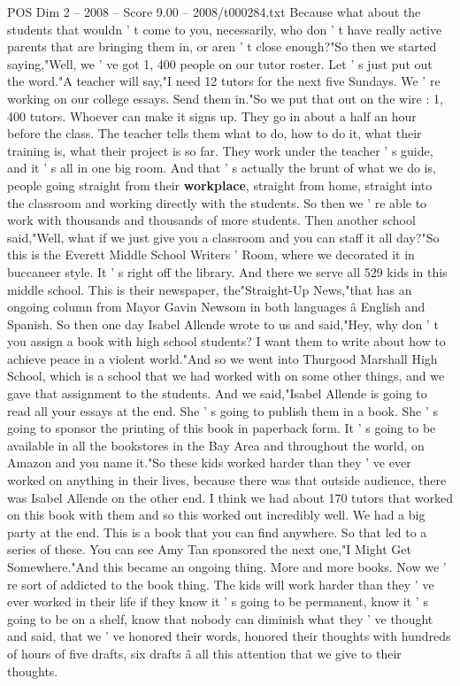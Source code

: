 \begin{textsample}{POS Dim 2 – 2008 – Score 9.00 – 2008/t000284.txt}
Because what about the students that wouldn ' t come to you, necessarily, who don ' t have really active parents that are bringing them in, or aren ' t close enough?"So then we started saying,"Well, we ' ve got 1, 400 people on our tutor roster.
Let ' s just put out the word."A teacher will say,"I need 12 tutors for the next five Sundays.
We ' re working on our college essays.
Send them in."So we put that out on the wire : 1, 400 tutors.
Whoever can make it signs up.
They go in about a half an hour before the class.
The teacher tells them what to do, how to do it, what their training is, what their project is so far.
They work under the teacher ' s guide, and it ' s all in one big room.
And that ' s actually the brunt of what we do is, people going straight from their \textbf{workplace}, straight from home, straight into the classroom and working directly with the students.
So then we ' re able to work with thousands and thousands of more students.
Then another school said,"Well, what if we just give you a classroom and you can staff it all day?"So this is the Everett Middle School Writers ' Room, where we decorated it in buccaneer style.
It ' s right off the library.
And there we serve all 529 kids in this middle school.
This is their newspaper, the"Straight-Up News,"that has an ongoing column from Mayor Gavin Newsom in both languages â English and Spanish.
So then one day Isabel Allende wrote to us and said,"Hey, why don ' t you assign a book with high school students?
I want them to write about how to achieve peace in a violent world."And so we went into Thurgood Marshall High School, which is a school that we had worked with on some other things, and we gave that assignment to the students.
And we said,"Isabel Allende is going to read all your essays at the end.
She ' s going to publish them in a book.
She ' s going to sponsor the printing of this book in paperback form.
It ' s going to be available in all the bookstores in the Bay Area and throughout the world, on Amazon and you name it."So these kids worked harder than they ' ve ever worked on anything in their lives, because there was that outside audience, there was Isabel Allende on the other end.
I think we had about 170 tutors that worked on this book with them and so this worked out incredibly well.
We had a big party at the end.
This is a book that you can find anywhere.
So that led to a series of these.
You can see Amy Tan sponsored the next one,"I Might Get Somewhere."And this became an ongoing thing.
More and more books.
Now we ' re sort of addicted to the book thing.
The kids will work harder than they ' ve ever worked in their life if they know it ' s going to be permanent, know it ' s going to be on a shelf, know that nobody can diminish what they ' ve thought and said, that we ' ve honored their words, honored their thoughts with hundreds of hours of five drafts, six drafts â all this attention that we give to their thoughts.

\end{textsample}
